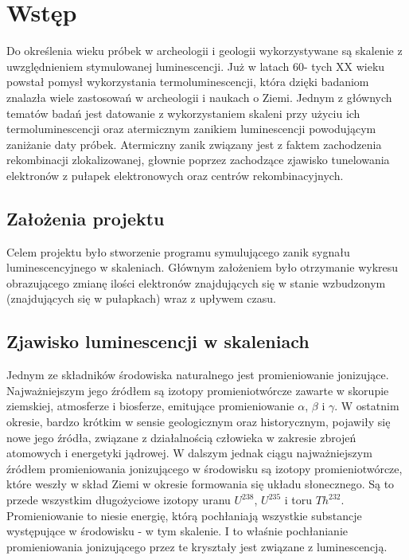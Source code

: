 \chapter{Wstęp}
Do określenia wieku próbek w archeologii i geologii wykorzystywane są skalenie z uwzględnieniem stymulowanej luminescencji. Już w latach 60- tych  XX wieku powstał pomysł wykorzystania termoluminescencji, która dzięki badaniom znalazła wiele zastosowań w archeologii i naukach o Ziemi. Jednym z głównych tematów badań jest datowanie z wykorzystaniem skaleni przy użyciu ich termoluminescencji oraz atermicznym zanikiem luminescencji powodującym zaniżanie daty próbek. Atermiczny zanik związany jest z faktem zachodzenia rekombinacji zlokalizowanej, głownie poprzez zachodzące zjawisko tunelowania elektronów z pułapek elektronowych oraz centrów rekombinacyjnych. 

\section{Założenia projektu}
Celem projektu było stworzenie programu symulującego zanik sygnału luminescencyjnego w skaleniach. Głównym założeniem było otrzymanie wykresu obrazującego zmianę ilości elektronów znajdujących się w stanie wzbudzonym (znajdujących się w pułapkach) wraz z upływem czasu.

\section{Zjawisko luminescencji w skaleniach}


Jednym ze składników środowiska naturalnego jest promieniowanie jonizujące. Najważniejszym jego źródłem są izotopy promieniotwórcze zawarte w skorupie ziemskiej, atmosferze
i biosferze, emitujące promieniowanie $\alpha$, $\beta$ i $\gamma$. 
W ostatnim okresie, bardzo krótkim w sensie geologicznym oraz historycznym, pojawiły
się nowe jego źródła, związane z działalnością człowieka w zakresie zbrojeń atomowych
i energetyki jądrowej. W dalszym jednak ciągu najważniejszym źródłem promieniowania
jonizującego w środowisku są izotopy promieniotwórcze, które weszły w skład Ziemi w okresie
formowania się układu słonecznego.  Są to przede wszystkim długożyciowe izotopy uranu $U^{238}$, $U^{235}$ i toru $Th^{232}$. Promieniowanie to niesie energię, którą pochłaniają wszystkie substancje występujące
w środowisku - w tym skalenie. I to właśnie pochłanianie promieniowania jonizującego przez te kryształy jest związane z luminescencją.

